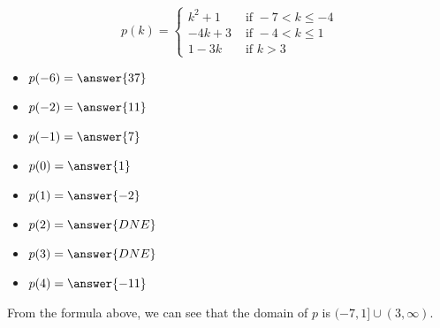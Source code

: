 \documentclass{ximera}
\begin{document}
\begin{question}

\[
p(k) = 
\begin{cases}
  k^2 + 1 & \text{ if } -7 < k \leq -4 \\
  -4k + 3 & \text{ if } -4 < k \leq 1 \\
  1 - 3k & \text{ if } k > 3
\end{cases}
\]


\begin{itemize}
\item $p(-6) = \answer{37}$  
\item $p(-2) = \answer{11}$ 
\item $p(-1) = \answer{7}$ 
\item $p(0) = \answer{1}$ 
\item $p(1) = \answer{-2}$ 
\item $p(2) = \answer{DNE}$ 
\item $p(3) = \answer{DNE}$ 
\item $p(4) = \answer{-11}$ 
\end{itemize}

\end{question}



From the formula above, we can see that the domain of $p$ is $(-7, 1] \cup (3, \infty)$.
\end{document}
